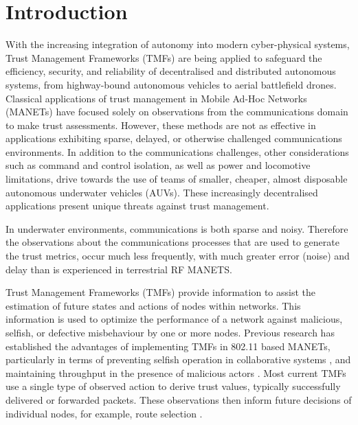 \documentclass{aamas2016}
\begin{document}




\section{Introduction}
With the increasing integration of autonomy into modern cyber-physical systems, Trust Management Frameworks (TMFs) are being applied to safeguard the efficiency, security, and reliability of decentralised and distributed autonomous systems, from highway-bound autonomous vehicles to aerial battlefield drones. 
Classical applications of trust management in Mobile Ad-Hoc Networks (MANETs) have focused solely on observations from the communications domain to make trust assessments. 
However, these methods are not as effective in applications exhibiting sparse, delayed, or otherwise challenged communications environments\cite{Pavan2015}. 
In addition to the communications challenges, other considerations such as command and control isolation, as well as power and locomotive limitations, drive towards the use of teams of smaller,  cheaper, almost disposable autonomous underwater vehicles (AUVs). These increasingly decentralised applications present unique threats against trust management. 

In underwater environments, communications is both sparse and noisy.
Therefore the observations about the communications processes that are used to generate the trust metrics, occur much less frequently, with much greater error (noise) and delay than is experienced in terrestrial RF MANETS.

Trust Management Frameworks (TMFs) provide information to assist the estimation of future states and actions of nodes within networks. This information is used to optimize the performance of a network against malicious, selfish, or defective misbehaviour by one or more nodes. Previous research has established the advantages of implementing TMFs in 802.11 based MANETs, particularly in terms of preventing selfish operation in collaborative systems \cite{Li2007}, and maintaining throughput in the presence of malicious actors \cite{Buchegger2002}. Most current TMFs use a single type of observed action to derive trust values, typically successfully delivered or forwarded packets. These observations then inform future decisions of individual nodes, for example, route selection \cite{Li2008}.
\end{document}
